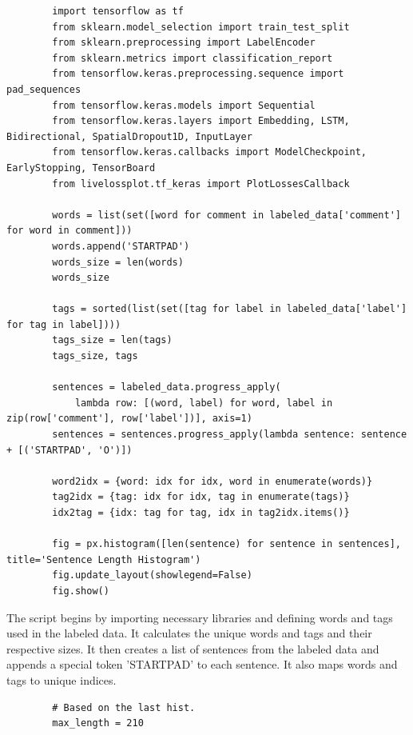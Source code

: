 \documentclass{solutionclass} %
\begin{document}
\begin{solution}

    \begin{lstlisting}
        import tensorflow as tf
        from sklearn.model_selection import train_test_split
        from sklearn.preprocessing import LabelEncoder
        from sklearn.metrics import classification_report
        from tensorflow.keras.preprocessing.sequence import pad_sequences
        from tensorflow.keras.models import Sequential
        from tensorflow.keras.layers import Embedding, LSTM, Bidirectional, SpatialDropout1D, InputLayer
        from tensorflow.keras.callbacks import ModelCheckpoint, EarlyStopping, TensorBoard
        from livelossplot.tf_keras import PlotLossesCallback
        
        words = list(set([word for comment in labeled_data['comment'] for word in comment]))
        words.append('STARTPAD')
        words_size = len(words)
        words_size
        
        tags = sorted(list(set([tag for label in labeled_data['label'] for tag in label])))
        tags_size = len(tags)
        tags_size, tags
        
        sentences = labeled_data.progress_apply(
            lambda row: [(word, label) for word, label in zip(row['comment'], row['label'])], axis=1)
        sentences = sentences.progress_apply(lambda sentence: sentence + [('STARTPAD', 'O')])
        
        word2idx = {word: idx for idx, word in enumerate(words)}
        tag2idx = {tag: idx for idx, tag in enumerate(tags)}
        idx2tag = {idx: tag for tag, idx in tag2idx.items()}
        
        fig = px.histogram([len(sentence) for sentence in sentences], title='Sentence Length Histogram')
        fig.update_layout(showlegend=False)
        fig.show()
        \end{lstlisting}
        
        The script begins by importing necessary libraries and defining words and tags used in the labeled data. It calculates the unique words and tags and their respective sizes. It then creates a list of sentences from the labeled data and appends a special token 'STARTPAD' to each sentence. It also maps words and tags to unique indices.
        
        \begin{lstlisting}
        # Based on the last hist.
        max_length = 210
        

\end{lstlisting}
\end{solution}
\end{document}
